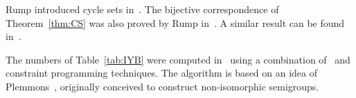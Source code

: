 Rump introduced cycle sets in~\cite{MR2132760}. The bijective correspondence of 
Theorem~\ref{thm:CS} was 
also proved by Rump in~\cite{MR2132760}. A similar result can be 
found in~\cite[Proposition 2.2]{MR1722951}. 

The numbers of Table~\ref{tab:IYB} were computed in~\cite{AMV}
using a combination of~\cite{GAP4} and constraint programming techniques. 
The algorithm is based on an idea of Plemmons~\cite{MR0258994}, originally 
conceived to construct non-isomorphic semigroups.  

